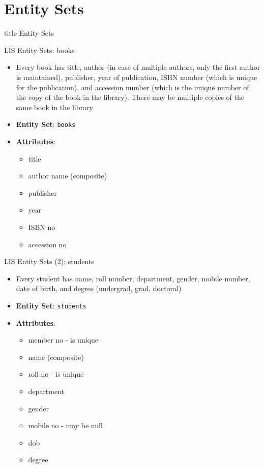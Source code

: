 \documentclass[aspectratio=169, xcolor=dvipsnames]{beamer}
\begin{document}
\section{Entity Sets}
\begin{frame}
  \vfill
  \centering
  \begin{beamercolorbox}[sep=8pt,center,shadow=true,rounded=true]{title}
    Entity Sets\par%
  \end{beamercolorbox}
  \vfill
\end{frame}

\begin{frame}{LIS Entity Sets: books}
    \begin{itemize}
        \item Every book has title, author (in case of multiple authors, only the first author is maintained), publisher, year of publication, ISBN number (which is unique for the publication), and accession number (which is the unique number of the copy of the book in the library). There may be multiple copies of the same book in the library
        \item \textbf{Entity Set}: \texttt{books}
        \item \textbf{Attributes}:
        \begin{itemize}
            \item title
            \item author name (composite)
            \item publisher
            \item year
            \item ISBN no
            \item accession no
        \end{itemize}
    \end{itemize}
\end{frame}

\begin{frame}{LIS Entity Sets (2): students}
    \begin{itemize}
        \item Every student has name, roll number, department, gender, mobile number, date of birth, and degree (undergrad, grad, doctoral)
        \item \textbf{Entity Set}: \texttt{students}
        \item \textbf{Attributes}:
        \begin{itemize}
            \item member no - is unique
            \item name (composite)
            \item roll no - is unique
            \item department
            \item gender
            \item mobile no - may be null
            \item dob
            \item degree
        \end{itemize}
    \end{itemize}
\end{frame}
\end{document}
